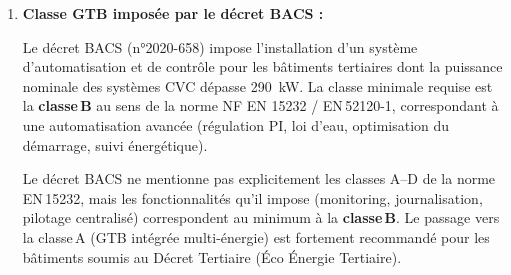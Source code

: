 \begin{enumerate}
  Calcul intermédiaire :
  \[
    (1{,}03)^{15} \approx 1{,}5580
    \quad\Rightarrow\quad
    \frac{1{,}5580 - 1}{0{,}03} = \frac{0{,}5580}{0{,}03} \approx 18{,}60
  \]

  \[
    B_{15} = 3\,817{,}4 \times 18{,}60 \approx \boxed{\SI{71003}{\euro}}
  \]

  Bénéfice net sur 15 ans (après déduction de l'investissement initial) :
  \[
    B_{net} = 71\,003 - 45\,000 = \boxed{\SI{26003}{\euro}}
  \]

  \item \textbf{Classe GTB imposée par le décret BACS :}

  Le décret BACS (n°2020-658) impose l'installation d'un système d'automatisation et de contrôle pour les bâtiments tertiaires dont la puissance nominale des systèmes CVC dépasse \SI{290}{\kilo\watt}. La classe minimale requise est la \textbf{classe\,B} au sens de la norme NF EN 15232 / EN\,52120-1, correspondant à une automatisation avancée (régulation PI, loi d'eau, optimisation du démarrage, suivi énergétique).

  \begin{attention}
    Le décret BACS ne mentionne pas explicitement les classes A–D de la norme EN\,15232, mais les fonctionnalités qu'il impose (monitoring, journalisation, pilotage centralisé) correspondent au minimum à la \textbf{classe\,B}. Le passage vers la classe\,A (GTB intégrée multi-énergie) est fortement recommandé pour les bâtiments soumis au Décret Tertiaire (Éco Énergie Tertiaire).
  \end{attention}
\end{enumerate}
